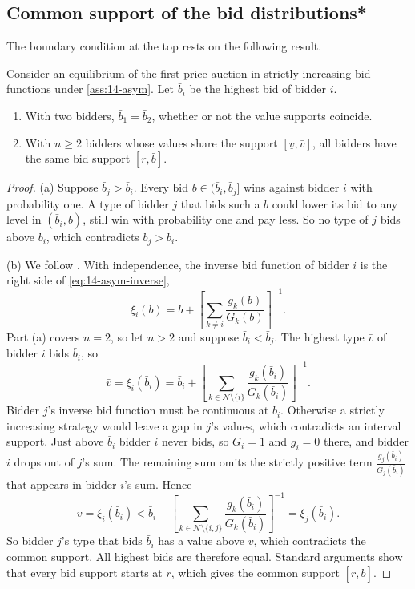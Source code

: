 \subsection{Common support of the bid distributions*}\label{sec:14-asym-support}

The boundary condition at the top rests on the following result.

\begin{proposition}\label{prop:14-common-support}
Consider an equilibrium of the first-price auction in strictly increasing bid functions under
\cref{ass:14-asym}. Let $\bar b_i$ be the highest bid of bidder $i$.
\begin{enumerate}[label=(\alph*)]
\item With two bidders, $\bar b_1=\bar b_2$, whether or not the value supports coincide.
\item \citep[Theorem 2.2]{AtheyHaile2007} With $n\ge 2$ bidders whose values share the support
$[\underline v,\bar v]$, all bidders have the same bid support $[r,\bar b]$.
\end{enumerate}
\end{proposition}

\begin{proof}
(a) Suppose $\bar b_j>\bar b_i$. Every bid $b\in(\bar b_i,\bar b_j]$ wins against bidder $i$ with
probability one. A type of bidder $j$ that bids such a $b$ could lower its bid to any level in
$(\bar b_i,b)$, still win with probability one and pay less. So no type of $j$ bids above $\bar
b_i$, which contradicts $\bar b_j>\bar b_i$.

(b) We follow \citet[proof of Theorem 2.2]{AtheyHaile2007}. With independence, the inverse bid
function of bidder $i$ is the right side of \eqref{eq:14-asym-inverse},
\[
\xi_i(b)=b+\left[\sum_{k\neq i}\frac{g_k(b)}{G_k(b)}\right]^{-1}.
\]
Part (a) covers $n=2$, so let $n>2$ and suppose $\bar b_i<\bar b_j$. The highest type $\bar v$ of
bidder $i$ bids $\bar b_i$, so
\[
\bar v=\xi_i(\bar b_i)=\bar b_i+\left[\sum_{k\in\mathcal N\setminus\{i\}}\frac{g_k(\bar b_i)}{G_k(\bar
b_i)}\right]^{-1}.
\]
Bidder $j$'s inverse bid function must be continuous at $\bar b_i$. Otherwise a strictly increasing
strategy would leave a gap in $j$'s values, which contradicts an interval support. Just above $\bar
b_i$ bidder $i$ never bids, so $G_i=1$ and $g_i=0$ there, and bidder $i$ drops out of $j$'s sum. The
remaining sum omits the strictly positive term $\frac{g_j(\bar b_i)}{G_j(\bar b_i)}$ that appears in
bidder $i$'s sum. Hence
\[
\bar v=\xi_i(\bar b_i)<\bar b_i+\left[\sum_{k\in\mathcal N\setminus\{i,j\}}\frac{g_k(\bar
b_i)}{G_k(\bar b_i)}\right]^{-1}=\xi_j(\bar b_i).
\]
So bidder $j$'s type that bids $\bar b_i$ has a value above $\bar v$, which contradicts the common
support. All highest bids are therefore equal. Standard arguments show that every bid support starts
at $r$, which gives the common support $[r,\bar b]$.
\end{proof}

